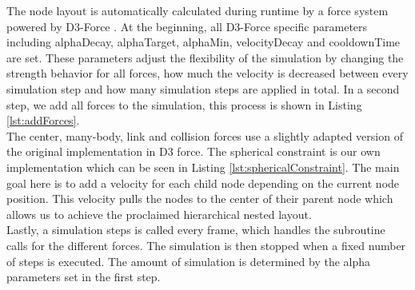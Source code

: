 The node layout is automatically calculated during runtime by a force system powered by D3-Force \cite{bostock_d3forcejs_nodate}. At the beginning, all D3-Force specific parameters including alphaDecay, alphaTarget, alphaMin, velocityDecay and cooldownTime are set. 
These parameters adjust the flexibility of the simulation by changing the strength behavior for all forces, how much the velocity is decreased between every simulation step and how many simulation steps are applied in total.
In a second step, we add all forces to the simulation, this process is shown in Listing \ref{lst:addForces}.\\
The center, many-body, link and collision forces use a slightly adapted version of the original implementation in D3 force. 
The spherical constraint is our own implementation which can be seen in Listing \ref{lst:sphericalConstraint}. The main goal here is to add a velocity for each child node depending on the current node position. This velocity pulls the nodes to the center of their parent node which allows us to achieve the proclaimed hierarchical nested layout.\\
Lastly, a simulation steps is called every frame, which handles the subroutine calls for the different forces. The simulation is then stopped when a fixed number of steps is executed. The amount of simulation is determined by the alpha parameters set in the first step.

